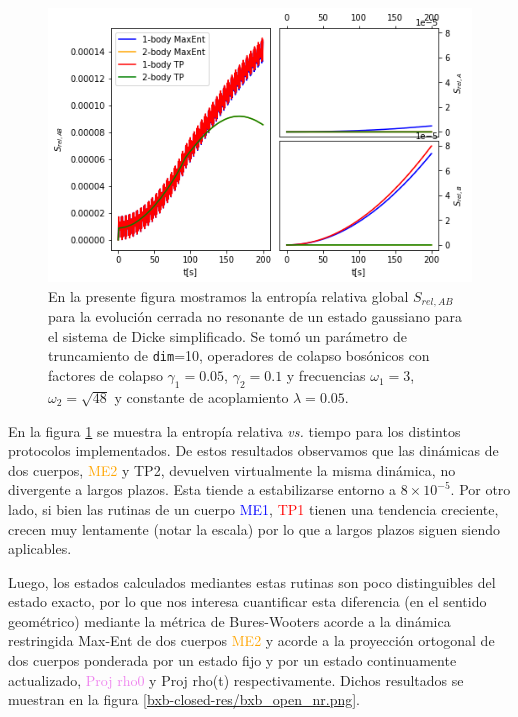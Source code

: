 \documentclass{report} %
\numberwithin{equation}{section}
\begin{document}
\begin{figure}
    \centering
    \includegraphics[scale=0.7]{figs/section3_4/section5_bxs-open-nonres/rel_entropy_bxs_nonres.png}
    \caption{En la presente figura mostramos la entropía relativa global $S_{rel,AB}$ para la evolución cerrada no resonante de un estado gaussiano para el sistema de Dicke simplificado. Se tomó un parámetro de truncamiento de \texttt{dim}=10, operadores de colapso bosónicos con factores de colapso $\gamma_1 = 0.05$, $\gamma_2 = 0.1$ y frecuencias $\omega_1 = 3$, $\omega_2 = \sqrt{48}$ y  constante de acoplamiento $\lambda = 0.05$.}
    \label{rel_entropy_open_nonres.png}
\end{figure}

En la figura \ref{rel_entropy_open_nonres.png} se muestra la entropía relativa \textit{vs.} tiempo para los distintos protocolos implementados. De estos resultados observamos que las dinámicas de dos cuerpos, \textcolor{orange}{ME2} y \textcolor{dark green}{TP2}, devuelven virtualmente la misma dinámica, no divergente a largos plazos. Esta tiende a estabilizarse entorno a $8 \times 10^{-5}$. Por otro lado, si bien las rutinas de un cuerpo  \textcolor{blue}{ME1}, \textcolor{red}{TP1} tienen una tendencia creciente, crecen muy lentamente (notar la escala) por lo que a largos plazos siguen siendo aplicables. 

Luego, los estados calculados mediantes estas rutinas son poco distinguibles del estado exacto, por lo que nos interesa cuantificar esta diferencia (en el sentido geométrico) mediante la métrica de Bures-Wooters acorde a la dinámica restringida Max-Ent de dos cuerpos \textcolor{orange}{ME2} y acorde a la proyección ortogonal de dos cuerpos ponderada por un estado fijo y por un estado continuamente actualizado, \textcolor{violet}{Proj rho0} y \textcolor{awesome}{Proj rho(t)} respectivamente. Dichos resultados se muestran en la figura 
\ref{bxb-closed-res/bxb_open_nr.png}. 
\end{document}
